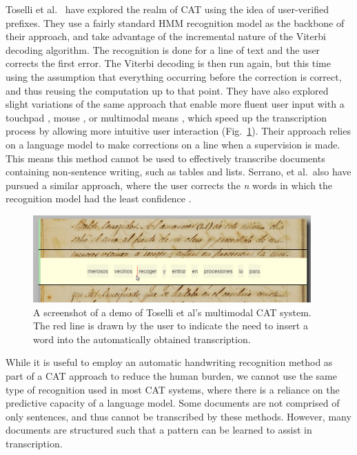 \documentclass[ms]{byuprop}
\begin{document}
Toselli et al.~\cite{Toselli2007} have explored the realm of CAT using the idea of user-verified prefixes. They use a fairly standard HMM recognition model as the backbone of their approach, and take advantage of the incremental nature of the Viterbi decoding algorithm. The recognition is done for a line of text and the user corrects the first error. The Viterbi decoding is then run again, but this time using the assumption that everything occurring before the correction is correct, and thus reusing the computation up to that point. They have also explored slight variations of the same approach that enable more fluent user input with a touchpad \cite{Toselli2008}, mouse \cite{Toselli2009}, or multimodal means \cite{Toselli2010}, which speed up the transcription process by allowing more intuitive user interaction (Fig.~\ref{fig:Toselli_multimodalCAT}). Their approach relies on a language model to make corrections on a line when a supervision is made. This means this method cannot be used to effectively transcribe documents containing non-sentence writing, such as tables and lists. Serrano, et al.~also have pursued a similar approach, where the user corrects the \textit{n} words in which the recognition model had the least confidence \cite{Serrano2014}.

\begin{figure}
    \centering
    \includegraphics[width=0.95\textwidth]{Toselli_multimodalCAT}
    \caption{A screenshot of a demo of Toselli et al's multimodal CAT system. The red line is drawn by the user to indicate the need to insert a word into the automatically obtained transcription.}
    \label{fig:Toselli_multimodalCAT}
\end{figure}

While it is useful to employ an automatic handwriting recognition method as part of a CAT approach to reduce the human burden, we cannot use the same type of recognition used in most CAT systems, where there is a reliance on the predictive capacity of a language model. Some documents are not comprised of only sentences, and thus cannot be transcribed by these methods. However, many documents are structured such that a pattern can be learned to assist in transcription.
\end{document}
